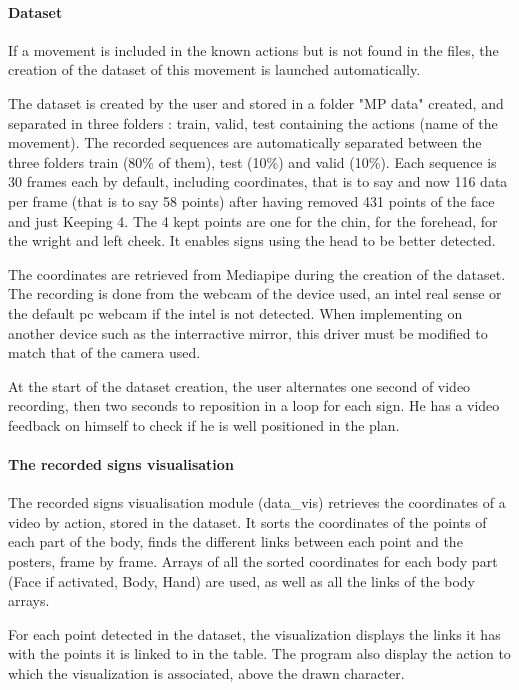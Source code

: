 \paragraph{Dataset}

If a movement is included in the known actions but is not found in the files, the creation of the dataset of this movement is launched automatically. 

The dataset is created by the user and stored in a folder "MP data" created, and separated in three
folders : train, valid, test containing the actions (name of the
movement). The recorded sequences are automatically separated
between the three folders train (80\% of them), test (10\%) and valid
(10\%). Each sequence is 30 frames each by default, including coordinates, that is to say and now 116 data per frame (that is to say 58 points) after having removed  431 points of the face and just Keeping 4. The 4 kept points are one for the chin, for the forehead, for the wright and left cheek.
It enables signs using the head to be better detected.

The coordinates are retrieved from Mediapipe during the creation of the dataset. The recording is done from the webcam of the device used, an intel real sense or the default pc webcam if the intel is not detected. When implementing on another device such as the interractive mirror, this driver must be modified to match that of the camera used.

At the start of the dataset creation, the user alternates one second of video recording, then two seconds to reposition in a loop for each sign. He has a video feedback on himself to check if he is well positioned in the plan.

\paragraph{The recorded signs visualisation}

The recorded signs visualisation module (data\_vis) retrieves the coordinates of a video by action, stored in the dataset.
It sorts the coordinates of the points of each part of the body, finds the different links between each point and the posters, frame by frame. Arrays of all the sorted coordinates for each body part (Face if activated, Body, Hand) are used, as well as all the links of the body arrays.

For each point detected in the dataset, the visualization displays the links it has with the points it is linked to in the table. The program also display the action to which the visualization is associated, above the drawn character.

